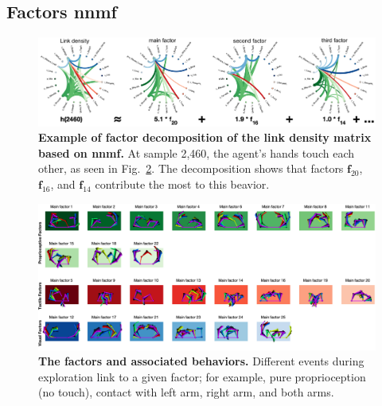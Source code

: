 \subsection{Factors \ac{nnmf}}
\begin{figure}[h!]
    \centering
    \includegraphics[width=1\linewidth]{fig/factors_decomposition.png}
    \caption{\textbf{Example of factor decomposition of the link density matrix based on \ac{nnmf}.} At sample 2,460, the agent's hands touch each other, as seen in Fig.~\ref{fig:main_factors}. The decomposition shows that factors $\bm{f}_{20}$, $\bm{f}_{16}$, and $\bm{f}_{14}$ contribute the most to this beavior. %
    }
    \label{fig:decomposition}
\end{figure}
\begin{figure}[!t]
	\begin{center}
		\hspace*{\fill}
        \includegraphics[width=1\textwidth]{fig/mainfactors_represente.png}
		\hspace*{\fill}
	\end{center}
    \vspace{-25pt}
	\caption{\textbf{The factors and associated behaviors.} Different events during exploration link to a given factor; for example, pure proprioception (no touch), contact with left arm, right arm, and both arms.}
    \label{fig:main_factors}
\end{figure}
 
